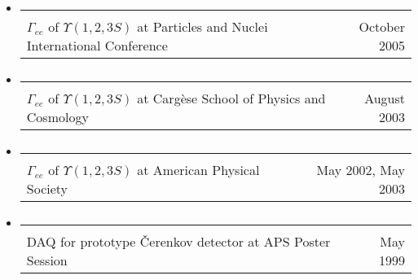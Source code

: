 \documentclass[12pt]{article}
\begin{document}
\begin{itemize}

  \item \hspace{-0.3 cm} \begin{tabular}{l r} \mbox{\hspace{0.55\linewidth}} & \mbox{\hspace{0.237\linewidth}} \vspace{-0.4 cm} \\
$\Gamma_{ee}$ of $\Upsilon(1,2,3S)$ at Particles and Nuclei International Conference \mbox{\hspace{-0.79 cm}} & October 2005 \end{tabular}

  \item \hspace{-0.3 cm} \begin{tabular}{l r} \mbox{\hspace{0.65\linewidth}} & \mbox{\hspace{0.237\linewidth}} \vspace{-0.4 cm} \\
$\Gamma_{ee}$ of $\Upsilon(1,2,3S)$ at Carg\`ese School of Physics and Cosmology & August 2003 \end{tabular}

  \item \hspace{-0.3 cm} \begin{tabular}{l r} \mbox{\hspace{0.65\linewidth}} & \mbox{\hspace{0.315\linewidth}} \vspace{-0.4 cm} \\
$\Gamma_{ee}$ of $\Upsilon(1,2,3S)$ at American Physical Society & May 2002, May 2003 \end{tabular}

  \item \hspace{-0.3 cm} \begin{tabular}{l r} \mbox{\hspace{0.65\linewidth}} & \mbox{\hspace{0.253\linewidth}} \vspace{-0.4 cm} \\
DAQ for prototype \v Cerenkov detector at APS Poster Session & May 1999 \end{tabular}

  \vspace{0.15 cm}


\end{itemize}
\end{document}
